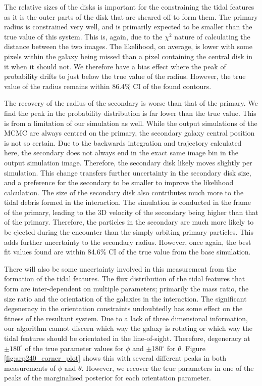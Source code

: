The relative sizes of the disks is important for the constraining the tidal features as it is the outer parts of the disk that are sheared off to form them. The primary radius is constrained very well, and is primarily expected to be smaller than the true value of this system. This is, again, due to the $\chi^{2}$ nature of calculating the distance between the two images. The likelihood, on average, is lower with some pixels within the galaxy being missed than a pixel containing the central disk in it when it should not. We therefore have a bias effect where the peak of probability drifts to just below the true value of the radius. However, the true value of the radius remains within 86.4\% CI of the found contours. 

The recovery of the radius of the secondary is worse than that of the primary. We find the peak in the probability distribution is far lower than the true value. This is from a limitation of our simulation as well. While the output simulations of the MCMC are always centred on the primary, the secondary galaxy central position is not so certain. Due to the backwards integration and trajectory calculated here, the secondary does not always end in the exact same image bin in the output simulation image. Therefore, the secondary disk likely moves slightly per simulation. This change transfers further uncertainty in the secondary disk size, and a preference for the secondary to be smaller to improve the likelihood calculation. The size of the secondary disk also contributes much more to the tidal debris formed in the interaction. The simulation is conducted in the frame of the primary, leading to the 3D velocity of the secondary being higher than that of the primary. Therefore, the particles in the secondary are much more likely to be ejected during the encounter than the simply orbiting primary particles. This adds further uncertainty to the secondary radius. However, once again, the best fit values found are within 84.6\% CI of the true value from the base simulation. 

There will also be some uncertainty involved in this measurement from the formation of the tidal features. The flux distribution of the tidal features that form are inter-dependent on multiple parameters; primarily the mass ratio, the size ratio and the orientation of the galaxies in the interaction. The significant degeneracy in the orientation constraints undoubtedly has some effect on the fitness of the resultant system. Due to a lack of three dimensional information, our algorithm cannot discern which way the galaxy is rotating or which way the tidal features should be orientated in the line-of-sight. Therefore, degeneracy at $\pm180^{\circ}$ of the true parameter values for $\phi$ and $\pm$180$^{\circ}$ for $\theta$. Figure \ref{fig:arp240_corner_plot} shows this with several different peaks in both measurements of $\phi$ and $\theta$. However, we recover the true parameters in one of the peaks of the marginalised posterior for each orientation parameter.

